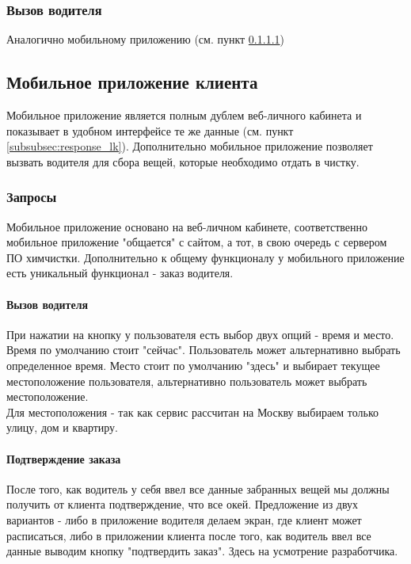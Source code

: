 \documentclass[DIV=calc, paper=a4, fontsize=11pt]{scrartcl} %
\begin{document}
\subsubsection{Вызов водителя}
Аналогично мобильному приложению (см. пункт \ref{paragraph:driver_call})

\subsection{Мобильное приложение клиента}
Мобильное приложение является полным дублем веб-личного кабинета и показывает в удобном интерфейсе те же данные (см. пункт \ref{subsubsec:response_lk}). Дополнительно мобильное приложение позволяет вызвать водителя для сбора вещей, которые необходимо отдать в чистку.

\subsubsection{Запросы}
Мобильное приложение основано на веб-личном кабинете, соответственно мобильное приложение "общается" с сайтом, а тот, в свою очередь с сервером ПО химчистки. Дополнительно к общему функционалу у мобильного приложение есть уникальный функционал - заказ водителя.

\paragraph{Вызов водителя}\label{paragraph:driver_call}
При нажатии на кнопку у пользователя есть выбор двух опций - время и место. Время по умолчанию стоит "сейчас". Пользователь может альтернативно выбрать определенное время. Место стоит по умолчанию "здесь" и выбирает текущее местоположение пользователя, альтернативно пользователь может выбрать местоположение.
\\[0.5cm]
Для местоположения - так как сервис рассчитан на Москву выбираем только улицу, дом и квартиру.

\paragraph{Подтверждение заказа}
После того, как водитель у себя ввел все данные забранных вещей мы должны получить от клиента подтверждение, что все окей. Предложение из двух вариантов - либо в приложение водителя делаем экран, где клиент может расписаться, либо в приложении клиента после того, как водитель ввел все данные выводим кнопку "подтвердить заказ". Здесь на усмотрение разработчика.
\end{document}
